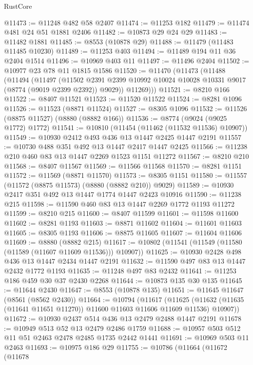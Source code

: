 \begin{lexlean}{RustCore}
\begin{coremodule}
@11473 := @11248 @482 @58 @2407
@11474 := @11253 @182
@11479 := @11474 @481 @24 @51 @1881 @2406
@11482 := @10873 @29 @24 @29
@11483 := @11482 @1881
@11485 := @8553 (@10878 @29)
@11488 := @11479 (@11483 @11485 @10230)
@11489 := @11253 @403
@11494 := @11489 @194 @11 @36 @2404 @1514
@11496 := @10969 @403 @11
@11497 := @11496 @2404
@11502 := @10977 @23 @78 @11 @1815 @1586
@11520 := @11470
    (@11473
      (@11488
        (@11494
          (@11497
            (@11502
              @2391
              @2399
              @10992
              @10024
              @10028
              @10331
              @9017
              (@8774 (@9019 @2399 @2392))
              @9029))
          @11269)))
@11521 := @8210 @166
@11522 := @8407 @11521
@11523 := @11520 @11522
@11524 := @8281 @1096
@11526 := @11523 (@8871 @11524)
@11527 := @8305 @1096
@11532 := @11526 (@8875 @11527) (@8880 (@8882 @166))
@11536 := @8774 (@9024 (@9025 @1772) @1772)
@11541 := @10810 (@11454 (@11462 (@11532 @11536) @10907))
@11549 := @10930 @2412 @493 @436 @13 @1447 @2425 @1447 @2191
@11557 := @10730 @488 @351 @492 @13 @1447 @2417 @1447 @2425
@11566 := @11238 @210 @460 @83 @13 @1447 @2269 @1523 @1151 @11272
@11567 := @8210 @210
@11568 := @8407 @11567
@11569 := @11566 @11568
@11570 := @8281 @1151
@11572 := @11569 (@8871 @11570)
@11573 := @8305 @1151
@11580 := @11557 (@11572 (@8875 @11573) (@8880 (@8882 @210)) @9029)
@11589 := @10930 @2417 @351 @492 @13 @1447 @1774 @1447 @2423 @10916
@11590 := @11238 @215
@11598 := @11590 @460 @83 @13 @1447 @2269 @1772 @1193 @11272
@11599 := @8210 @215
@11600 := @8407 @11599
@11601 := @11598 @11600
@11602 := @8281 @1193
@11603 := @8871 @11602
@11604 := @11601 @11603
@11605 := @8305 @1193
@11606 := @8875 @11605
@11607 := @11604 @11606
@11609 := @8880 (@8882 @215)
@11617 := @10802 (@11541 (@11549 (@11580 (@11589 (@11607 @11609 @11536))) @10907))
@11625 := @10930 @2428 @498 @436 @13 @1447 @2434 @1447 @2191
@11632 := @11590 @497 @83 @13 @1447 @2432 @1772 @1193
@11635 := @11248 @497 @83 @2432
@11641 := @11253 @186 @459 @30 @37 @2430 @2268
@11644 := @10873 @135 @30 @135
@11645 := @11644 @2430
@11647 := @8553 (@10878 @135)
@11651 := @11645 @11647 (@8561 (@8562 @2430))
@11664 := @10794
    (@11617
      (@11625 (@11632 (@11635 (@11641 @11651 @11270)) @11600 @11603 @11606 @11609 @11536) @10907))
@11672 := @10930 @2437 @514 @436 @13 @2479 @2488 @1447 @2191
@11678 := @10949 @513 @52 @13 @2479 @2486 @1759
@11688 := @10957 @503 @512 @11 @51 @2463 @2478 @2485 @1735 @2442 @1441
@11691 := @10969 @503 @11 @2463
@11693 := @10975 @186 @29
@11755 := @10786
    (@11664
      (@11672
        (@11678

\end{coremodule}
\end{lexlean}
